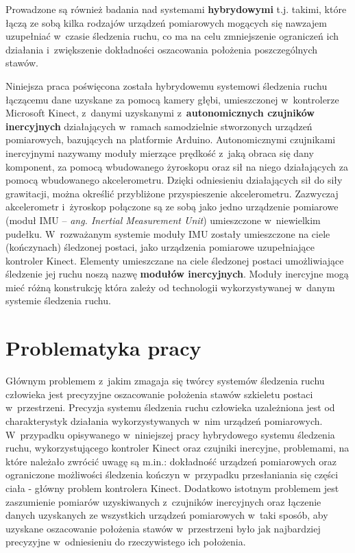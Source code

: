

Prowadzone są również badania nad systemami \textbf{hybrydowymi} t.j. takimi, które łączą ze sobą kilka rodzajów urządzeń pomiarowych mogących się nawzajem uzupełniać w~czasie śledzenia ruchu, co ma na celu zmniejszenie ograniczeń ich działania i~zwiększenie dokładności oszacowania położenia poszczególnych stawów.

Niniejsza praca poświęcona została hybrydowemu systemowi śledzenia ruchu łączącemu dane uzyskane za pomocą kamery głębi, umieszczonej w~kontrolerze Microsoft Kinect, z~danymi uzyskanymi z~\textbf{autonomicznych czujników inercyjnych} działających w~ramach samodzielnie stworzonych urządzeń pomiarowych, bazujących na platformie Arduino. Autonomicznymi czujnikami inercyjnymi nazywamy moduły mierzące prędkość z~jaką obraca się dany komponent, za pomocą wbudowanego żyroskopu oraz sił na niego działających za pomocą wbudowanego akcelerometru. Dzięki odniesieniu działających sił do siły grawitacji, można określić przybliżone przyspieszenie akcelerometru.
Zazwyczaj akcelerometr i~żyroskop połączone są ze sobą jako jedno urządzenie pomiarowe (moduł IMU -- \emph{ang. Inertial Measurement Unit}) umieszczone w~niewielkim pudełku. W~rozważanym systemie moduły IMU zostały umieszczone na ciele (kończynach) śledzonej postaci, jako urządzenia pomiarowe uzupełniające kontroler Kinect. Elementy umieszczane na ciele śledzonej postaci umożliwiające śledzenie jej ruchu noszą nazwę \textbf{modułów inercyjnych}. Moduły inercyjne mogą mieć różną konstrukcję która zależy od technologii wykorzystywanej w~danym systemie śledzenia ruchu.\\

\section{Problematyka pracy}
Głównym problemem z~jakim zmagaja się twórcy systemów śledzenia ruchu człowieka jest precyzyjne oszacowanie położenia stawów szkieletu postaci w~przestrzeni. Precyzja systemu śledzenia ruchu człowieka uzależniona jest od charakterystyk działania wykorzystywanych w~nim urządzeń pomiarowych. W~przypadku opisywanego w~niniejszej pracy hybrydowego systemu śledzenia ruchu, wykorzystującego kontroler Kinect oraz czujniki inercyjne, problemami, na które należało zwrócić uwagę są m.in.: dokładność urządzeń pomiarowych oraz ograniczone możliwości śledzenia kończyn w~przypadku przesłaniania się części ciała - główny problem kontrolera Kinect. Dodatkowo istotnym problemem jest zaszumienie pomiarów uzyskiwanych z~czujników inercyjnych oraz łączenie danych uzyskanych ze wszystkich urządzeń pomiarowych w~taki sposób, aby uzyskane oszacowanie położenia stawów w~przestrzeni było jak najbardziej precyzyjne w~odniesieniu do rzeczywistego ich położenia.\\

